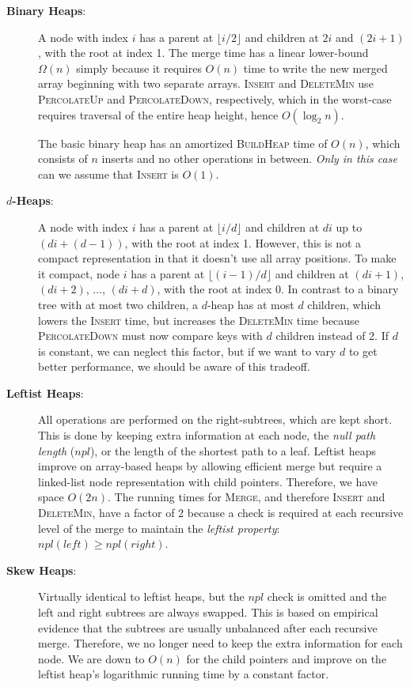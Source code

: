 \documentclass{article}[10pt,letterpaper]
\begin{document}
\begin{description}
\item[\textbf{Binary Heaps}:] A node with index $i$ has a parent at
$\lfloor i/2 \rfloor$ and children at $2i$ and $(2i+1)$, with the root at
index 1. The merge time has a linear lower-bound  $\Omega(n)$ simply because
it requires $O(n)$ time to write the new merged array beginning with
two separate arrays. \textsc{Insert} and \textsc{DeleteMin} use
\textsc{PercolateUp} and \textsc{PercolateDown}, respectively, which in
the worst-case requires traversal of the entire heap height, hence
$O(\log_2{n})$.

The basic binary heap has an amortized \textsc{BuildHeap} time of $O(n)$, which
consists of $n$ inserts and no other operations in between.
\textit{Only in this case} can we assume that \textsc{Insert} is $O(1)$.

\item[\textbf{$d$-Heaps}:] 
A node with index $i$ has a parent at
$\lfloor i/d \rfloor$ and children at $di$ up to $(di+(d-1))$, with the root at
index 1. However, this is not a compact representation in that it doesn't
use all array positions. To make it compact, node $i$ has a parent at
$\lfloor (i-1)/d \rfloor$ and children at $(di+1)$, $(di+2)$, $\ldots$,
$(di+d)$,
with the root at index 0. In contrast to a binary tree with at most two
children, a $d$-heap has at most $d$ children, which lowers the
\textsc{Insert} time, but increases the \textsc{DeleteMin} time because
\textsc{PercolateDown} must now compare keys with $d$ children instead of
2. If $d$ is constant, we can neglect this factor, but if we want to vary
$d$ to get better performance, we should be aware of this tradeoff.

\item[\textbf{Leftist Heaps}:] All operations are performed
on the right-subtrees, which are kept short. This is done by keeping
extra information at each node, the \textit{null path length} ($npl$), or
the length of the shortest path to a leaf. Leftist heaps improve on
array-based heaps by allowing efficient merge but require a linked-list node
representation with child pointers. Therefore, we have space $O(2n)$.
The running times for \textsc{Merge}, and therefore \textsc{Insert}
and \textsc{DeleteMin}, have a factor of 2 because a check is required
at each recursive level of the merge to maintain the \textit{leftist property}:
$npl(left) \ge npl(right)$.

\item[\textbf{Skew Heaps}:] Virtually identical to leftist heaps, but the
$npl$ check is omitted and the left and right subtrees are always swapped.
This is based on empirical evidence that the subtrees are usually
unbalanced after each recursive merge. Therefore, we no longer need to keep
the extra information for each node. We are down to $O(n)$ for the child
pointers and improve on the leftist heap's logarithmic running time by
a constant factor.


\end{description}
\end{document}
